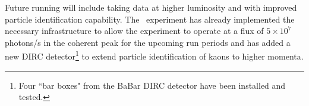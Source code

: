 Future running will include taking data at higher luminosity  and with improved particle identification capability. The \gx~experiment has already implemented the necessary infrastructure to allow the experiment to operate at a flux of $5\times10^{7}$ photons/s in the coherent peak for the upcoming run periods and has added a new DIRC detector\footnote{Four ``bar boxes" from the BaBar DIRC\cite{Aubert:2001tu} detector have been installed and tested.} to extend particle identification of kaons to higher momenta. 

